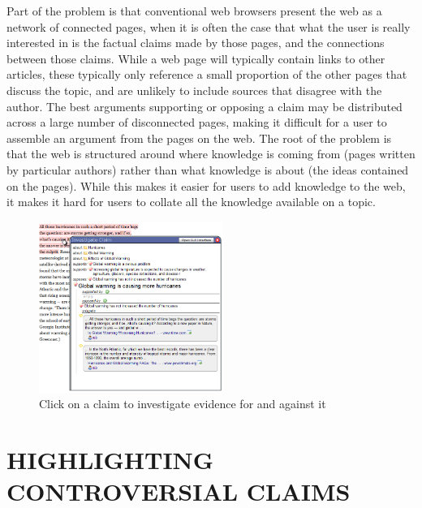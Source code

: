 \documentclass{chi2009}
\begin{document}
Part of the problem is that conventional web browsers present the web as a network of connected pages, when it is often the case that what the user is really interested in is the factual claims made by those pages, and the connections between those claims. While a web page will typically contain links to other articles, these typically only reference a small proportion of the other pages that discuss the topic, and are unlikely to include sources that disagree with the author. The best arguments supporting or opposing a claim may be distributed across a large number of disconnected pages, making it difficult for a user to assemble an argument from the pages on the web. The root of the problem is that the web is structured around where knowledge is coming from (pages written by particular authors) rather than what knowledge is about (the ideas contained on the pages). While this makes it easier for users to add knowledge to the web, it makes it hard for users to collate all the knowledge available on a topic.

\begin{figure}[tb]
	\begin{center}
	\includegraphics[width=6cm]{../screenshots/claim_popup_crop2.png}
	\caption{Click on a claim to investigate evidence for and against it}
	\label{claimview}
	\end{center}
\end{figure}




\section{HIGHLIGHTING CONTROVERSIAL CLAIMS}
\end{document}
